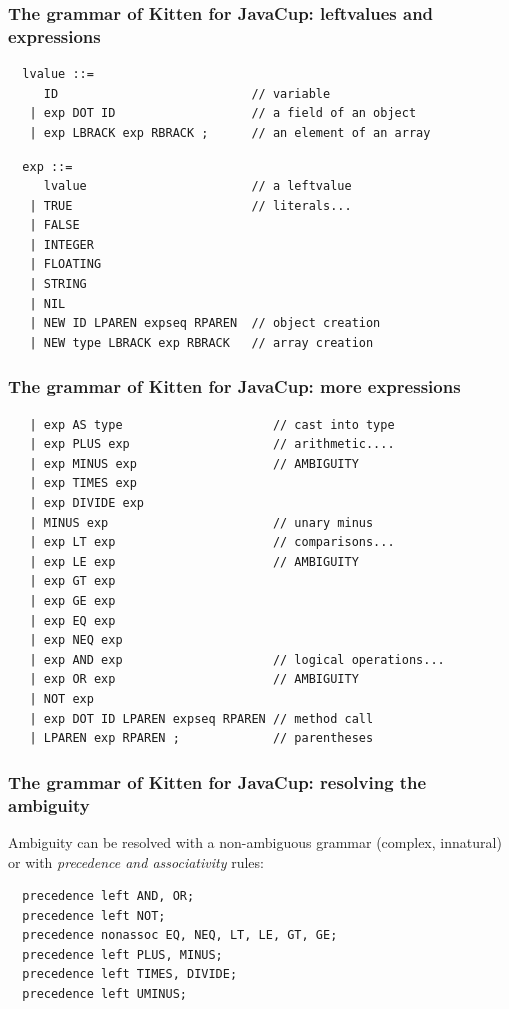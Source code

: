 \documentclass[11pt]{beamer}  %
\begin{document}
\begin{frame}[fragile]\frametitle{The grammar of Kitten for JavaCup: leftvalues and expressions}

\begin{verbatim}
  lvalue ::=
     ID                           // variable
   | exp DOT ID                   // a field of an object
   | exp LBRACK exp RBRACK ;      // an element of an array
\end{verbatim}

\begin{verbatim}
  exp ::=
     lvalue                       // a leftvalue
   | TRUE                         // literals...
   | FALSE  
   | INTEGER
   | FLOATING
   | STRING  
   | NIL     
   | NEW ID LPAREN expseq RPAREN  // object creation
   | NEW type LBRACK exp RBRACK   // array creation
\end{verbatim}

\end{frame}

\begin{frame}[fragile]\frametitle{The grammar of Kitten for JavaCup: more expressions}

\vspace*{-2ex}
\begin{verbatim}
   | exp AS type                     // cast into type
   | exp PLUS exp                    // arithmetic....
   | exp MINUS exp                   // AMBIGUITY
   | exp TIMES exp
   | exp DIVIDE exp
   | MINUS exp                       // unary minus
   | exp LT exp                      // comparisons...
   | exp LE exp                      // AMBIGUITY
   | exp GT exp
   | exp GE exp
   | exp EQ exp
   | exp NEQ exp
   | exp AND exp                     // logical operations...
   | exp OR exp                      // AMBIGUITY
   | NOT exp
   | exp DOT ID LPAREN expseq RPAREN // method call
   | LPAREN exp RPAREN ;             // parentheses
\end{verbatim}

\end{frame}

\begin{frame}[fragile]\frametitle{The grammar of Kitten for JavaCup: resolving the ambiguity}

Ambiguity can be resolved with a non-ambiguous grammar (complex, innatural) or with
\emph{precedence and associativity} rules:
%
\begin{verbatim}
  precedence left AND, OR;
  precedence left NOT;
  precedence nonassoc EQ, NEQ, LT, LE, GT, GE;
  precedence left PLUS, MINUS;
  precedence left TIMES, DIVIDE;
  precedence left UMINUS;
\end{verbatim}

\end{frame}
\end{document}
